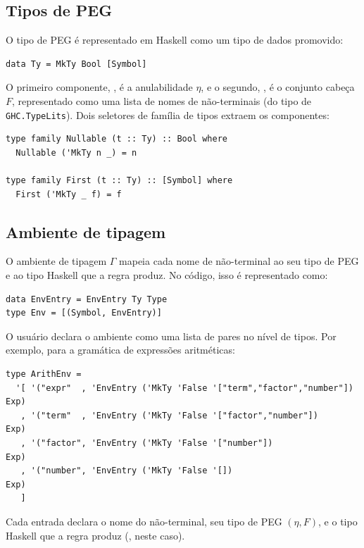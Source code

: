 \subsection{Tipos de PEG}

O tipo de PEG é representado em Haskell como um tipo de dados
promovido:

\begin{verbatim}
data Ty = MkTy Bool [Symbol]
\end{verbatim}

O primeiro componente, , é a anulabilidade \(\eta\), e o
segundo, \haskell{[Symbol]}, é o conjunto cabeça \(F\), representado
como uma lista de nomes de não-terminais (do tipo  de
\verb|GHC.TypeLits|). Dois seletores de família de tipos extraem os
componentes:

\begin{verbatim}
type family Nullable (t :: Ty) :: Bool where
  Nullable ('MkTy n _) = n

type family First (t :: Ty) :: [Symbol] where
  First ('MkTy _ f) = f
\end{verbatim}

\subsection{Ambiente de tipagem}

O ambiente de tipagem \(\Gamma\) mapeia cada nome de não-terminal ao
seu tipo de PEG e ao tipo Haskell que a regra produz. No código, isso
é representado como:

\begin{verbatim}
data EnvEntry = EnvEntry Ty Type
type Env = [(Symbol, EnvEntry)]
\end{verbatim}

O usuário declara o ambiente como uma lista de pares no nível de tipos.
Por exemplo, para a gramática de expressões aritméticas:

\begin{verbatim}
type ArithEnv =
  '[ '("expr"  , 'EnvEntry ('MkTy 'False '["term","factor","number"]) Exp)
   , '("term"  , 'EnvEntry ('MkTy 'False '["factor","number"])        Exp)
   , '("factor", 'EnvEntry ('MkTy 'False '["number"])                 Exp)
   , '("number", 'EnvEntry ('MkTy 'False '[])                         Exp)
   ]
\end{verbatim}

Cada entrada declara o nome do não-terminal, seu tipo de PEG
\((\eta, F)\), e o tipo Haskell que a regra produz (, neste
caso).

